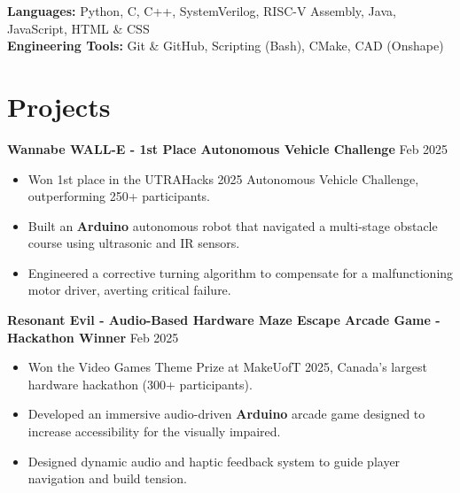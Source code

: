 \documentclass[10pt,letterpaper]{article}
\begin{document}
\hspace{0.75em}\textbf{Languages:} 
    Python, C, C++, SystemVerilog, RISC-V Assembly, Java, JavaScript, HTML \& CSS \\

\hspace{0.75em}\textbf{Engineering Tools:} 
Git \& GitHub, Scripting (Bash), CMake, CAD (Onshape) \\

\section{Projects}

\textbf{Wannabe WALL-E - 1st Place Autonomous Vehicle Challenge} \hfill Feb 2025 \\
\begin{itemize}
    \item Won 1st place in the UTRAHacks 2025 Autonomous Vehicle Challenge, outperforming 250+ participants. 
    \item Built an \textbf{Arduino} autonomous robot that navigated a multi-stage obstacle course using ultrasonic and IR sensors.
    \item Engineered a corrective turning algorithm to compensate for a malfunctioning motor driver, averting critical failure. 
\end{itemize}

\textbf{Resonant Evil - Audio-Based Hardware Maze Escape Arcade Game - Hackathon Winner} \hfill Feb 2025 \\
\begin{itemize}
    \item Won the Video Games Theme Prize at MakeUofT 2025, Canada's largest hardware hackathon (300+ participants). 
    \item Developed an immersive audio-driven \textbf{Arduino} arcade game designed to increase accessibility for the visually impaired.
    \item Designed dynamic audio and haptic feedback system to guide player navigation and build tension. 
\end{itemize}
\end{document}
